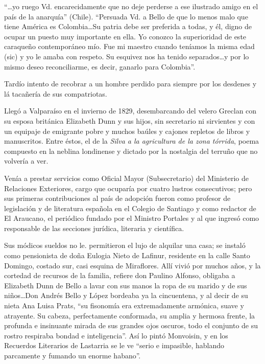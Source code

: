 \documentclass[10pt,twoside,openright]{memoir}
\begin{document}
``\ldots yo ruego Vd. encarecidamente que no deje perderse a ese ilustrado
amigo en el país de la anarquía'' (Chile). ``Persuada Vd. a Bello de que
lo menos malo que tiene América es Colombia\ldots Su patria debe ser
preferida a todas, y él, digno de ocupar un puesto muy importante en
ella. Yo conozco la superioridad de este caraqueño contemporáneo mío.
Fue mi maestro cuando teníamos la misma edad (sic) y yo le amaba con
respeto. Su esquivez nos ha tenido separados\ldots y por lo mismo deseo
reconciliarme, es decir, ganarlo para Colombia''.

Tardío intento de recobrar a un hombre perdido para siempre por los
desdenes y lá tacañería de sus compatriotas.

Llegó a Valparaíso en el invierno de 1829, desembarcando del velero
Greclan con su esposa británica Elizabeth Dunn y sus hijos, sin
secretario ni sirvientes y con un equipaje de emigrante pobre y muchos
baúles y cajones repletos de libros y manuscritos. Entre éstos, el de la
\emph{Silva a la agricultura de la zona tórrida}, poema compuesto en la
neblina londinense y dictado por la nostalgia del terruño que no
volvería a ver.

Venía a prestar servicios como Oficial Mayor (Subsecretario) del
Ministerio de Relaciones Exteriores, cargo que ocuparía por cuatro
lustros consecutivos; pero sus primeras contribuciones al país de
adopción fueron como profesor de legislación y de literatura española en
el Colegio de Santiago y como redactor de El Araucano, el periódico
fundado por el Ministro Portales y al que ingresó como responsable de
las secciones jurídica, literaria y científica.

Sus módicos sueldos no le. permitieron el lujo de alquilar una casa; se
instaló como pensionista de doña Eulogia Nieto de Lafinur, residente en
la calle Santo Domingo, costado sur, casi esquina de Miraflores. Allí
vivió por muchos años, y la cortedad de recursos de la familia, refiere
don Paulino Alfonso, obligaba a Elizabeth Dunn de Bello a lavar con sus
manos la ropa de su marido y de sus niños\ldots Don Andrés Bello y López
bordeaba ya la cincuentena, y al decir de su nieta Ana Luisa Prats, ``su
fisonomía era extremadamente armónica, suave y atrayente. Su cabeza,
perfectamente conformada, su amplia y hermosa frente, la profunda e
insinuante mirada de sus grandes ojos oscuros, todo el conjunto de su
rostro respiraba bondad e inteligencia''. Así lo pintó Monvoisin, y en
los Recuerdos Literarios de Lastarria se le ve ``serio e impasible,
hablando parcamente y fumando un enorme habano''.
\end{document}
